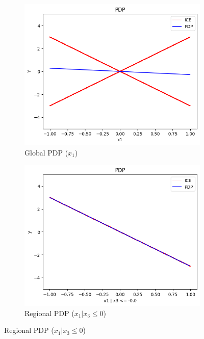 \documentclass[
twocolumn,
]{ceurart}
\begin{document}
\begin{figure}[t]
    \centering
    \begin{subfigure}[b]{0.33\textwidth}
        \centering
        \includegraphics[width=\textwidth]{figures/simulation_1/uncor_global_pdp.png}
        \caption{Global PDP ($x_1$)}
        \label{subfig:a}
    \end{subfigure}
    \begin{subfigure}[b]{0.33\textwidth}
        \centering
        \includegraphics[width=\textwidth]{figures/simulation_1/uncor_regional_pdp_1.png}
        \caption{Regional PDP ($x_1 | x_3 \leq 0$)}

\end{subfigure}
\end{figure}
\end{document}
